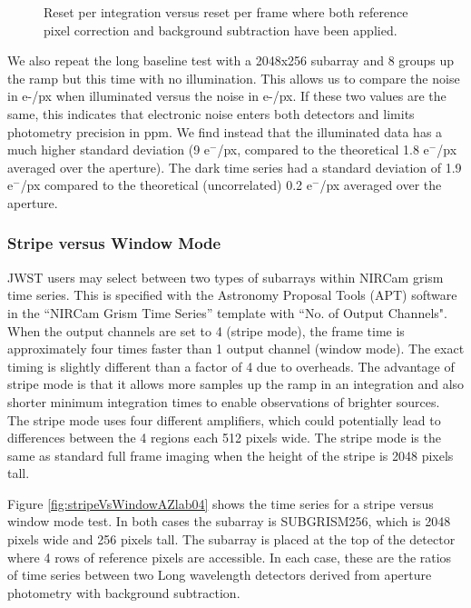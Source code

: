 \documentclass{aastex62}
\begin{document}
\begin{figure}
{}
{}
\caption{Reset per integration versus reset per frame where both reference pixel correction and background subtraction have been applied.}\label{fig:RPFvsRPItseries}
\end{figure}

We also repeat the long baseline test with a 2048x256 subarray and 8 groups up the ramp but this time with no illumination.
This allows us to compare the noise in e-/px when illuminated versus the noise in e-/px.
If these two values are the same, this indicates that electronic noise enters both detectors and limits photometry precision in ppm.
We find instead that the illuminated data has a much higher standard deviation (9 e$^-$/px, compared to the theoretical 1.8 e$^-$/px averaged over the aperture).
The dark time series had a standard deviation of 1.9 e$^-$/px compared to the theoretical (uncorrelated) 0.2 e$^-$/px averaged over the aperture.

\clearpage

\subsubsection{Stripe versus Window Mode}
JWST users may select between two types of subarrays within NIRCam grism time series.
This is specified with the Astronomy Proposal Tools (APT) software in the ``NIRCam Grism Time Series'' template with ``No. of Output Channels".
When the output channels are set to 4 (stripe mode), the frame time is approximately four times faster than 1 output channel (window mode).
The exact timing is slightly different than a factor of 4 due to overheads.
The advantage of stripe mode is that it allows more samples up the ramp in an integration and also shorter minimum integration times to enable observations of brighter sources.
The stripe mode uses four different amplifiers, which could potentially lead to differences between the 4 regions each 512 pixels wide.
The stripe mode is the same as standard full frame imaging when the height of the stripe is 2048 pixels tall.

Figure \ref{fig:stripeVsWindowAZlab04} shows the time series for a stripe versus window mode test.
In both cases the subarray is SUBGRISM256, which is 2048 pixels wide and 256 pixels tall.
The subarray is placed at the top of the detector where 4 rows of reference pixels are accessible.
In each case, these are the ratios of time series between two Long wavelength detectors derived from aperture photometry with background subtraction.
\end{document}
